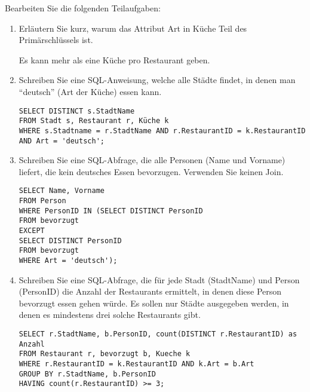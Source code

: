 \documentclass{bschlangaul-aufgabe}
\begin{document}
Bearbeiten Sie die folgenden Teilaufgaben:

\begin{enumerate}


\item Erläutern Sie kurz, warum das Attribut Art in Küche Teil des
Primärschlüssels ist.

\begin{bAntwort}
Es kann mehr als eine Küche pro Restaurant geben.
\end{bAntwort}


\item Schreiben Sie eine SQL-Anweisung, welche alle Städte findet, in
denen man “deutsch” (Art der Küche) essen kann.

\begin{bAntwort}
\begin{verbatim}
SELECT DISTINCT s.StadtName
FROM Stadt s, Restaurant r, Küche k
WHERE s.Stadtname = r.StadtName AND r.RestaurantID = k.RestaurantID AND Art = 'deutsch';
\end{verbatim}
\end{bAntwort}


\item Schreiben Sie eine SQL-Abfrage, die alle Personen (Name und
Vorname) liefert, die kein deutsches Essen bevorzugen. Verwenden Sie
keinen Join.

\begin{bAntwort}
\begin{verbatim}
SELECT Name, Vorname
FROM Person
WHERE PersonID IN (SELECT DISTINCT PersonID
FROM bevorzugt
EXCEPT
SELECT DISTINCT PersonID
FROM bevorzugt
WHERE Art = 'deutsch');
\end{verbatim}
\end{bAntwort}


\item Schreiben Sie eine SQL-Abfrage, die für jede Stadt (StadtName) und
Person (PersonID) die Anzahl der Restaurants ermittelt, in denen diese
Person bevorzugt essen gehen würde. Es sollen nur Städte ausgegeben
werden, in denen es mindestens drei solche Restaurants gibt.

\begin{bAntwort}
\begin{verbatim}
SELECT r.StadtName, b.PersonID, count(DISTINCT r.RestaurantID) as Anzahl
FROM Restaurant r, bevorzugt b, Kueche k
WHERE r.RestaurantID = k.RestaurantID AND k.Art = b.Art
GROUP BY r.StadtName, b.PersonID
HAVING count(r.RestaurantID) >= 3;
\end{verbatim}
\end{bAntwort}


\end{enumerate}
\end{document}
